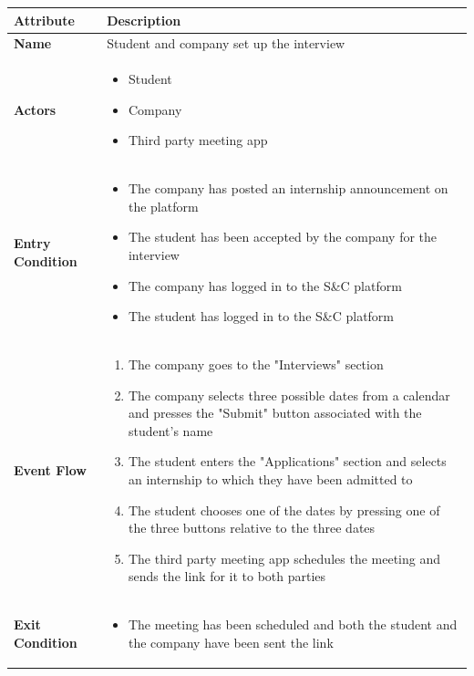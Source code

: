 \begin{center}
    
    \begin{tabular}{|p{3cm}|p{9cm}|}
    \hline
    \textbf{Attribute} & \textbf{Description} \\ \hline
    \textbf{Name} & Student and company set up the interview \\ \hline
    \textbf{Actors} & 
    \begin{itemize}
        \item Student
        \item Company
        \item Third party meeting app
    \end{itemize} \\ \hline
    \textbf{Entry Condition} & 
    \begin{itemize}
        \item The company has posted an internship announcement on the platform
        \item The student has been accepted by the company for the interview 
        \item The company has logged in to the S\&C platform
        \item The student has logged in to the S\&C platform
    \end{itemize}\\ \hline
    \textbf{Event Flow} & 
    \begin{enumerate}
        \item The company goes to the "Interviews" section
        \item The company selects three possible dates from a calendar and presses the "Submit" button associated with the student's name
        \item The student enters the "Applications" section and selects an internship to which they have been admitted to
        \item The student chooses one of the dates by pressing one of the three buttons relative to the three dates
        \item The third party meeting app schedules the meeting and sends the link for it to both parties
    \end{enumerate} \\ \hline
    \textbf{Exit Condition} & 
    \begin{itemize}
        \item The meeting has been scheduled and both the student and the company have been sent the link
    \end{itemize}\\ \hline

\end{tabular}
\end{center}
